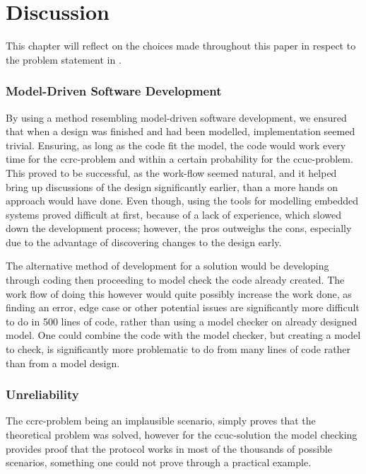 \section{Discussion}\label{sec:discussion}
This chapter will reflect on the choices made throughout this paper in respect to the problem statement in .

\subsubsection{Model-Driven Software Development}
By using a method resembling model-driven software development, we ensured that when a design was finished and had been modelled, implementation seemed trivial.
Ensuring, as long as the code fit the model, the code would work every time for the \gls{ccrc}-problem and within a certain probability for the \gls{ccuc}-problem.
This proved to be successful, as the work-flow seemed natural, and it helped bring up discussions of the design significantly earlier, than a more hands on approach would have done.
Even though, using the tools for modelling embedded systems proved difficult at first, because of a lack of experience, which slowed down the development process; however, the pros outweighs the cons, especially due to the advantage of discovering changes to the design early.

The alternative method of development for a solution would be developing through coding then proceeding to model check the code already created.
The work flow of doing this however would quite possibly increase the work done, as finding an error, edge case or other potential issues are significantly more difficult to do in 500 lines of code, rather than using a model checker on already designed model.
One could combine the code with the model checker, but creating a model to check, is significantly more problematic to do from many lines of code rather than from a model design.

\subsubsection{Unreliability}
The \gls{ccrc}-problem being an implausible scenario, simply proves that the theoretical problem was solved, however for the \gls{ccuc}-solution the model checking provides proof that the protocol works in most of the thousands of possible scenarios, something one could not prove through a practical example.

